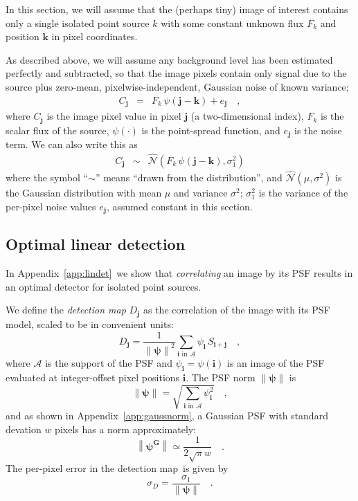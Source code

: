 \documentclass[letterpaper,preprint]{aastex}
\newcommand{\appref}[1]{\mbox{Appendix~\ref{#1}}}
\newcommand{\detmap}{detection map}
\newcommand{\drawnfrom}{\sim}
\newcommand{\gaussianN}{\mathcal{N}}
\newcommand{\gaussx}[1]{\hat{\gaussianN}\!\left(#1\right)}
\newcommand{\psf}{\psi}
\newcommand{\psfat}[1]{\psf_{#1}}
\newcommand{\psfnorm}{\norm{\bm{\psf}}}
\newcommand{\norm}[1]{\left\lVert #1 \right\rVert}
\newcommand{\psfw}{w}
\newcommand{\noise}{e}
\renewcommand{\vec}[1]{\boldsymbol{#1}}
\newcommand{\ivec}{\vec{i}}
\newcommand{\jvec}{\vec{j}}
\newcommand{\kvec}{\vec{k}}
\newcommand{\iina}{\ivec \,\, \mathrm{in} \,\, \mathcal{A}}
\begin{document}
In this section, we will assume that the (perhaps tiny) image of
interest contains only a single isolated point source $k$ with some
constant unknown flux $F_k$ and position $\kvec$ in pixel coordinates.

As described above, we will assume any background level has been
estimated perfectly and subtracted, so that the image pixels contain
only signal due to the source plus zero-mean, pixelwise-independent,
Gaussian noise of known variance;
\begin{eqnarray}\displaystyle
  C_{\jvec} &=& F_k \, \psi(\jvec - \kvec)  + \noise_{\jvec} \quad ,
\end{eqnarray}
where $C_{\jvec}$ is the image pixel value in pixel $\jvec$ (a
two-dimensional index), $F_k$ is the scalar flux of the source,
$\psi(\cdot)$ is the point-spread function, and $\noise_{\jvec}$ is
the noise term.  We can also write this as
\begin{eqnarray}\displaystyle
  C_{\jvec} &\drawnfrom& \gaussx{F_k \, \psi(\jvec - \kvec), \sigma_1^2}
\label{eq:modelimg}
\end{eqnarray}
where the symbol ``$\drawnfrom$'' means ``drawn from the
distribution'', and $\gaussx{\mu,\sigma^2}$ is the Gaussian
distribution with mean $\mu$ and variance $\sigma^2$; $\sigma_1^2$ is
the variance of the per-pixel noise values $\noise_{\jvec}$, assumed
constant in this section.







\subsection{Optimal linear detection}

In \appref{app:lindet}\ we show that \emph{correlating} an image by
its PSF results in an optimal detector for isolated point sources.

We define the \emph{\detmap} $D_{\jvec}$ as the correlation of
the image with its PSF model, scaled to be in convenient units:
\begin{equation}
D_{\jvec} = \frac{1}{\psfnorm^2} \sum_{\iina} \psfat{\ivec} \, S_{\ivec + \jvec} \quad ,
\label{eq:detmap}
\end{equation}
where $\mathcal{A}$ is the support of the PSF and
$\psfat{\ivec} = \psf(\ivec)$ is an image of the PSF evaluated at
integer-offset pixel positions $\ivec$.  The PSF norm $\psfnorm$ is
\begin{equation}
\psfnorm = \sqrt{\sum_{\iina} \psfat{\ivec}^2} \quad ,
\end{equation}
and as shown in \appref{app:gaussnorm}, a Gaussian PSF with standard
devation $\psfw$ pixels has a norm approximately:
\begin{equation}
  \norm{\bm{\psf^G}} \simeq \frac{1}{2 \sqrt{\pi} \psfw} \quad .
\end{equation}
The per-pixel error in the \detmap\ is given by
\begin{equation}
\sigma_{D} = \frac{\sigma_1}{\psfnorm} \quad .
\end{equation}
\end{document}
